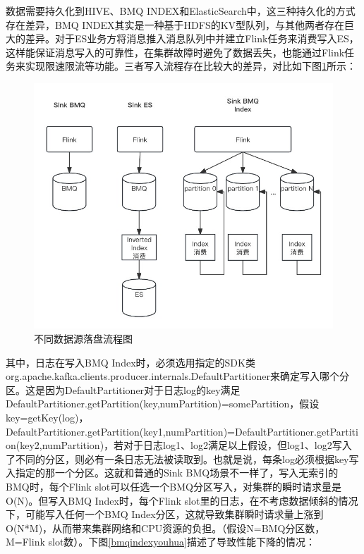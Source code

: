 数据需要持久化到HIVE、BMQ INDEX和ElasticSearch中，这三种持久化的方式存在差异，BMQ INDEX其实是一种基于HDFS的KV型队列，与其他两者存在巨大的差异。对于ES业务方将消息推入消息队列中并建立Flink任务来消费写入ES，这样能保证消息写入的可靠性，在集群故障时避免了数据丢失，也能通过Flink任务来实现限速限流等功能。三者写入流程存在比较大的差异，对比如下图\ref{butongshujuyuan}所示：

\begin{figure}[htb]
  \centering
  \includegraphics[width=5in]{figure/chapter4/不同数据源落盘流程图.jpg}
  \caption{不同数据源落盘流程图}\label{butongshujuyuan}
\end{figure}

其中，日志在写入BMQ Index时，必须选用指定的SDK类org.apache.kafka\linebreak.clients.producer.internals.DefaultPartitioner来确定写入哪个分区。这是因为DefaultPartitioner对于日志log的key满足DefaultPartitioner.getPartition(key,numPart\linebreak ition)=somePartition，假设key=getKey(log)，DefaultPartitioner.getPartition(key1,n\linebreak umPartition)=DefaultPartitioner.getPartition(key2,numPartition)，若对于日志log1、log2满足以上假设，但log1、log2写入了不同的分区，则必有一条日志无法被读取到。也就是说，每条log必须根据key写入指定的那一个分区。这就和普通的Sink BMQ场景不一样了，写入无索引的BMQ时，每个Flink slot可以任选一个BMQ分区写入，对集群的瞬时请求量是O(N)。但写入BMQ Index时，每个Flink slot里的日志，在不考虑数据倾斜的情况下，可能写入任何一个BMQ Index分区，这就导致集群瞬时请求量上涨到O(N*M)，从而带来集群网络和CPU资源的负担。（假设N=BMQ分区数，M=Flink slot数）。下图\ref{bmqindexyouhua}描述了导致性能下降的情况：

